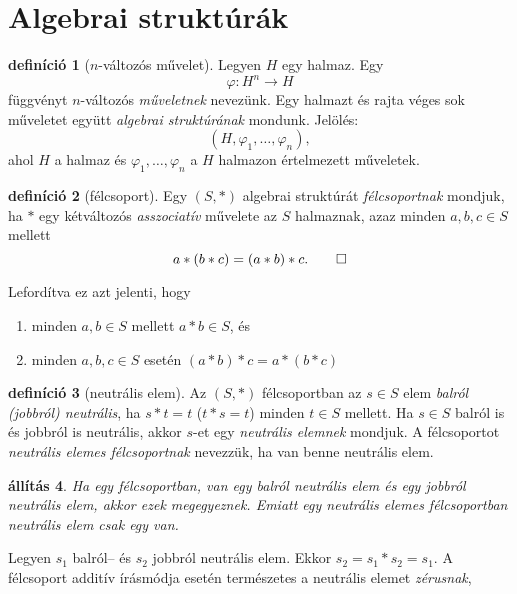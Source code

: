 \documentclass[9pt, a4paper, showtrims]{memoir}
\makeatletter
\renewenvironment{proof}[1][\proofname]
    {\par\pushQED{\qed}%
    \normalfont \topsep6\p@\@plus6\p@\relax
    \trivlist
    \item[\hskip\labelsep
        \itshape
    #1\@addpunct{:}]\ignorespaces}
    {\popQED\endtrivlist\@endpefalse}
\theoremstyle{plain}
\newtheorem{proposition}{állítás}[chapter]
\theoremstyle{remark}
\theoremstyle{definition}
\newtheorem{definition}[proposition]{definíció}
\makeatother
\begin{document}
\section{Algebrai struktúrák}
\begin{definition}[$n$-változós művelet]
	Legyen $H$ egy halmaz. Egy
	\[
		\varphi\colon H^n\to H
	\]
	függvényt $n$-változós \emph{műveletnek} nevezünk.
	Egy halmazt és rajta véges sok műveletet együtt \emph{algebrai struktúrának} mondunk.
	Jelölés:
	$$\left(H,\varphi_1,\ldots,\varphi_n  \right),$$
	ahol $H$ a halmaz és
	$\varphi_1,\ldots,\varphi_n$ a $H$ halmazon értelmezett műveletek.
\end{definition}
\begin{definition}[félcsoport]
	Egy $\left( S,\ast \right)$ algebrai struktúrát \emph{félcsoportnak} mondjuk,
	ha $\ast$ egy kétváltozós \emph{asszociatív}
	művelete az $S$ halmaznak,
	azaz minden $a,b,c\in S$ mellett
	\[
		a\ast\left( b\ast c \right)=\left( a\ast b\right)\ast c.\qedhere
	\]
\end{definition}
Lefordítva ez azt jelenti, hogy
\begin{enumerate}
	\item minden $a,b\in S$ mellett $a\ast b\in S$, és
	\item minden $a,b,c\in S$ esetén $\left( a\ast b \right)\ast c=a\ast\left( b\ast c \right)$
\end{enumerate}
\begin{definition}[neutrális elem]
	Az $\left( S,\ast \right)$ félcsoportban az $s\in S$ elem \emph{balról (jobbról) neutrális},
	ha $s\ast t=t$ ($t\ast s=t$) minden $t\in S$ mellett.
	Ha $s\in S$ balról is és jobbról is neutrális, akkor $s$-et egy \emph{neutrális elemnek}
	mondjuk.
	A félcsoportot \emph{neutrális elemes félcsoportnak} nevezzük, ha van benne neutrális elem.
\end{definition}
\begin{proposition}
	Ha egy félcsoportban, van egy balról neutrális elem és egy jobbról neutrális elem,
	akkor ezek megegyeznek.
	Emiatt egy neutrális elemes félcsoportban neutrális elem csak egy van.
\end{proposition}
\begin{proof}
	Legyen $s_1$ balról-- és $s_2$ jobbról neutrális elem.
	Ekkor
	\(
	s_2=s_1\ast s_2=s_1.
	\)
\end{proof}
A félcsoport additív írásmódja esetén természetes a neutrális elemet \emph{zérusnak},
\end{document}
